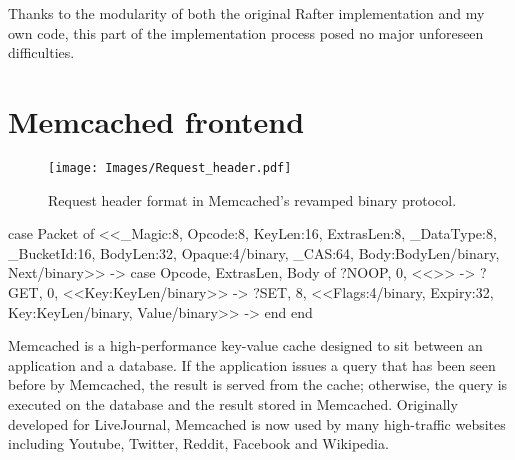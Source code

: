 \documentclass[12pt,chapterprefix=true,toc=bibliography,numbers=noendperiod,
               footnotes=multiple,twoside]{scrreprt}
\begin{document}
Thanks to the modularity of both the original Rafter implementation and my own code, this part of the implementation process posed no major unforeseen difficulties.

\section{Memcached frontend}

\begin{figure}[p]
    \centering
    \texttt{[image: Images/Request\_header.pdf]}
    \caption[Request header format in Memcached's revamped binary protocol]{Request header format in Memcached's revamped binary protocol.
    }
    \label{fig:request-header}
\end{figure}

\begin{listing}[p]
    \begin{erlangcode}
case Packet of
    <<_Magic:8,    Opcode:8,    KeyLen:16,
      ExtrasLen:8, _DataType:8, _BucketId:16,
      BodyLen:32,
      Opaque:4/binary,     %
      _CAS:64,             %
      Body:BodyLen/binary, %
      Next/binary>> ->     %
        case {Opcode, ExtrasLen, Body} of
            {?NOOP, 0, <<>>} ->
            {?GET,  0, <<Key:KeyLen/binary>>} ->
            {?SET,  8, <<Flags:4/binary, Expiry:32, Key:KeyLen/binary,
                         Value/binary>>} ->
        end
end
    \end{erlangcode}
    \caption[Request decoding in Erlang]{Memcached request decoder implementation for the binary protocol described in \cref{fig:request-header}. The structure of the \texttt{case Packet} reflects the structure of the packet header. Note how the variable \texttt{BodyLen} captured in the case statement can be used to specify the size of the \texttt{Body} variable within the same case statement. Variables preceded by an underscore are unused.}
    \label{lst:request-header}
\end{listing}

Memcached is a high-performance key-value cache designed to sit between an application and a database. If the application issues a query that has been seen before by Memcached, the result is served from the cache; otherwise, the query is executed on the database and the result stored in Memcached. Originally developed for LiveJournal, Memcached is now used by many high-traffic websites including Youtube, Twitter, Reddit, Facebook and Wikipedia.
\end{document}

